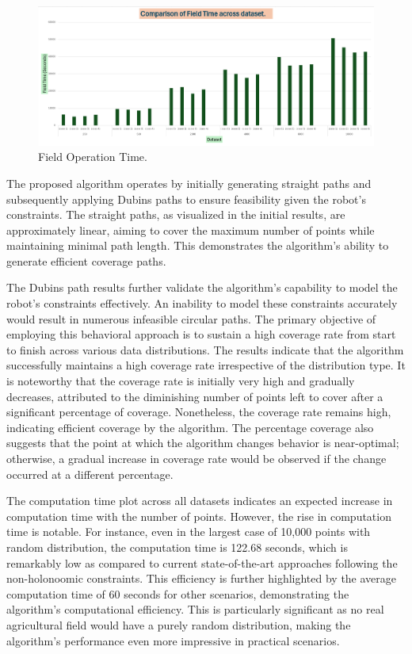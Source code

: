\begin{figure}[H]
    \centering
    \includegraphics[width=\textwidth]{Images/plots/no_obs/Field_time.png}
    \caption{Field Operation Time.}
    \label{fig:Field_operation_time}
\end{figure}


The proposed algorithm operates by initially generating straight paths and subsequently applying Dubins paths to ensure feasibility given the robot's constraints. The straight paths, as visualized in the initial results, are approximately linear, aiming to cover the maximum number of points while maintaining minimal path length. This demonstrates the algorithm's ability to generate efficient coverage paths.

\vspace{3mm} 

The Dubins path results further validate the algorithm's capability to model the robot's constraints effectively. An inability to model these constraints accurately would result in numerous infeasible circular paths. The primary objective of employing this behavioral approach is to sustain a high coverage rate from start to finish across various data distributions. The results indicate that the algorithm successfully maintains a high coverage rate irrespective of the distribution type. It is noteworthy that the coverage rate is initially very high and gradually decreases, attributed to the diminishing number of points left to cover after a significant percentage of coverage. Nonetheless, the coverage rate remains high, indicating efficient coverage by the algorithm. The percentage coverage also suggests that the point at which the algorithm changes behavior is near-optimal; otherwise, a gradual increase in coverage rate would be observed if the change occurred at a different percentage.

\vspace{3mm} 

The computation time plot across all datasets indicates an expected increase in computation time with the number of points. However, the rise in computation time is notable. For instance, even in the largest case of 10,000 points with random distribution, the computation time is 122.68 seconds, which is remarkably low as compared to current state-of-the-art approaches following the non-holonoomic constraints. This efficiency is further highlighted by the average computation time of 60 seconds for other scenarios, demonstrating the algorithm's computational efficiency. This is particularly significant as no real agricultural field would have a purely random distribution, making the algorithm's performance even more impressive in practical scenarios.

